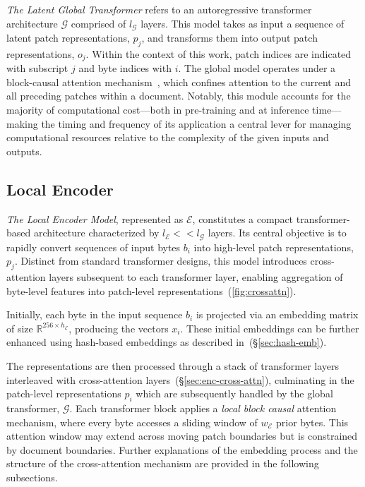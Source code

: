\textit{The Latent Global Transformer} refers to an autoregressive transformer architecture $\mathcal{G}$ comprised of $l_{\mathcal{G}}$ layers. This model takes as input a sequence of latent patch representations, $p_j$, and transforms them into output patch representations, $o_j$. Within the context of this work, patch indices are indicated with subscript $j$ and byte indices with $i$. The global model operates under a block-causal attention mechanism~\citep{dubey2024llama}, which confines attention to the current and all preceding patches within a document. Notably, this module accounts for the majority of computational cost—both in pre-training and at inference time—making the timing and frequency of its application a central lever for managing computational resources relative to the complexity of the given inputs and outputs.

\subsection{Local Encoder}
\label{section:local}

\textit{The Local Encoder Model}, represented as $\mathcal{E}$, constitutes a compact transformer-based architecture characterized by $l_{\mathcal{E}} << l_{\mathcal{G}}$ layers. Its central objective is to rapidly convert sequences of input bytes $b_i$ into high-level patch representations, $p_j$. Distinct from standard transformer designs, this model introduces cross-attention layers subsequent to each transformer layer, enabling aggregation of byte-level features into patch-level representations~(\autoref{fig:crossattn}).

Initially, each byte in the input sequence $b_i$ is projected via an embedding matrix of size $\mathbb{R}^{256 \times h_{\mathcal{E}}}$, producing the vectors $x_i$. These initial embeddings can be further enhanced using hash-based embeddings as described in~(\S\ref{sec:hash-emb}).

The representations are then processed through a stack of transformer layers interleaved with cross-attention layers~(\S\ref{sec:enc-cross-attn}), culminating in the patch-level representations $p_i$ which are subsequently handled by the global transformer, $\mathcal{G}$. Each transformer block applies a \textit{local block causal} attention mechanism, where every byte accesses a sliding window of $w_{\mathcal{E}}$ prior bytes. This attention window may extend across moving patch boundaries but is constrained by document boundaries. Further explanations of the embedding process and the structure of the cross-attention mechanism are provided in the following subsections.

